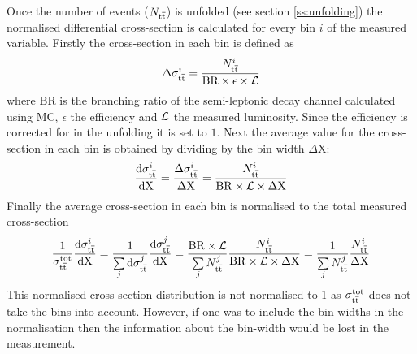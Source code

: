 Once the number of \ttbar events ($N_{\mathrm{t}\overline{\mathrm{t}}}$) is unfolded (see section \ref{ss:unfolding}) the normalised
differential cross-section is calculated for every bin $i$ of the measured variable. Firstly the cross-section in each bin is
defined as
\begin{equation}\label{eq:finll_1}
\Delta\sigma_{\mathrm{t}\overline{\mathrm{t}}}^i = \frac{N_{\mathrm{t}\overline{\mathrm{t}}}^i}{\mathrm{BR} \times \epsilon \times {\cal L}} 
\end{equation}
where BR is the branching ratio of the semi-leptonic decay channel calculated using MC, $\epsilon$ the \ttbar efficiency
and ${\cal L}$ the measured luminosity. Since the efficiency is corrected for in the unfolding it is set to $1$.
Next the average value for the cross-section in each bin is obtained by dividing by the bin width $\Delta \mathrm{X}$:
\begin{equation}
\frac{\mathrm{d}\sigma_{\mathrm{t}\overline{\mathrm{t}}}^i}{\mathrm{d} \mathrm{X}} =
\frac{\Delta\sigma_{\mathrm{t}\overline{\mathrm{t}}}^i}{\Delta \mathrm{X} } = \frac{N_{\mathrm{t}\overline{\mathrm{t}}}^i}{\mathrm{BR} \times {\cal L} \times \Delta \mathrm{X}} 
\end{equation}
Finally the average cross-section in each bin is normalised to the total measured cross-section
\begin{equation}
\label{eq:normalisedxs}
\frac{1}{\sigma_{\mathrm{t}\overline{\mathrm{t}}}^\mathrm{tot}} \frac{\mathrm{d}\sigma_{\mathrm{t}\overline{\mathrm{t}}}^i}{\mathrm{d} \mathrm{X}} =
\frac{1}{\sum\limits_{j}{\mathrm{d}\sigma_{\mathrm{t}\overline{\mathrm{t}}}^j}} \frac{\mathrm{d}\sigma_{\mathrm{t}\overline{\mathrm{t}}}^j}{\mathrm{d} \mathrm{X}} =
\frac{\mathrm{BR} \times {\cal L}}{\sum\limits_{j}{N_{\mathrm{t}\overline{\mathrm{t}}}^j}}\frac{N_{\mathrm{t}\overline{\mathrm{t}}}^i}{\mathrm{BR} \times {\cal L} \times \Delta
\mathrm{X}} = \frac{1}{\sum\limits_{j}{N_{\mathrm{t}\overline{\mathrm{t}}}^j}}\frac{N_{\mathrm{t}\overline{\mathrm{t}}}^i}{\Delta\mathrm{X}}
\end{equation}
This normalised cross-section distribution is not normalised to 1 as $\sigma_{\mathrm{t}\overline{\mathrm{t}}}^\mathrm{tot}$ does not take the bins
into account. However, if one was to include the bin widths in the normalisation then the information about the
bin-width would be lost in the measurement.


		